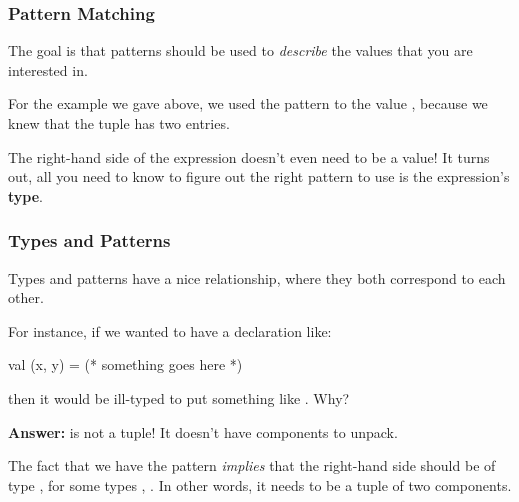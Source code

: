 \documentclass[aspectratio=169]{beamer}
\begin{document}
\begin{frame}[fragile]
  \frametitle{Pattern Matching}


  \pause
  \vspace{5pt}

  The goal is that patterns should be used to \textit{describe} the values that you are interested
  in.

  \pause
  \vspace{\fill}

  For the example we gave above, we used the pattern  to 
  the value , because we knew that the tuple  has two entries. 

  \pause
  \vspace{\fill}

  The right-hand side of the expression doesn't even need to be a value! It turns out,
  all you need to know to figure out the right pattern to use is the expression's
  \textbf{type}.
\end{frame}

\begin{frame}[fragile]
  \frametitle{Types and Patterns}

  \tgs

  Types and patterns have a nice relationship, where they both correspond to each other.

  \pause
  \vspace{\fill}

  For instance, if we wanted to have a declaration like:
  \begin{codeblock}
    val (x, y) = (* something goes here *)
  \end{codeblock}

  then it would be ill-typed to put something like . Why?

  \pause
  \vspace{\fill}

  \textbf{Answer:}  is not a tuple! It doesn't have components to unpack.

  \pause
  \vspace{\fill}

  The fact that we have the pattern  \textit{implies} that the right-hand side
  should be of type , for some types , . In other words,
  it needs to be a tuple of two components.
\end{frame}
\end{document}

